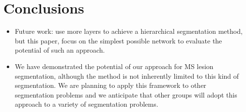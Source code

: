 \section{Conclusions}

\begin{itemize}
\item Future work: use more layers to achieve a hierarchical segmentation
method, but this paper, focus on the simplest possible network to evaluate the
potential of such an approach.
\item We have demonstrated the potential of our approach for MS lesion
segmentation, although the method is not inherently limited to this kind of
segmentation. We are planning to apply this framework to other segmentation
problems and we anticipate that other groups will adopt this approach to a
variety of segmentation problems.
\end{itemize}

